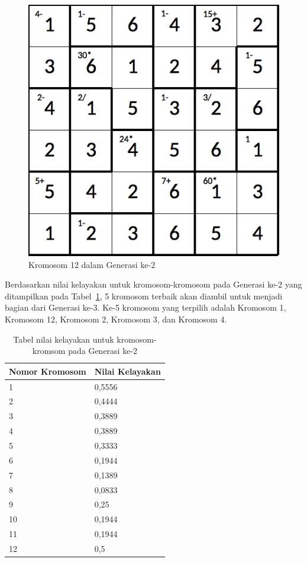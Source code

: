 \begin{figure}
\centering
\captionsetup{justification=centering}
\includegraphics[scale=0.333]{Gambar/hybridgenetic/Generation2Chromosome12}
\caption[Kromosom 12 dalam Generasi ke-2]{Kromosom 12 dalam Generasi ke-2}
\label{fig:analisisg2k12}
\end{figure}

\clearpage

Berdasarkan nilai kelayakan untuk kromosom-kromosom pada Generasi ke-2 yang ditampilkan pada Tabel~\ref{tab:analisishg3}, 5 kromosom terbaik akan diambil untuk menjadi bagian dari Generasi ke-3. Ke-5 kromosom yang terpilih adalah Kromosom 1, Kromosom 12, Kromosom 2, Kromosom 3, dan Kromosom 4.

\begin{table}
\centering
\captionsetup{justification=centering}
\caption[Tabel nilai kelayakan untuk kromosom-kromsom pada Generasi ke-1]{Tabel nilai kelayakan untuk kromosom-kromsom pada Generasi ke-2}
\begin{tabular}{| l | l |}
\hline
Nomor Kromosom & Nilai Kelayakan \\
\hline \hline
1 & 0,5556 \\
\hline
2 & 0,4444 \\
\hline
3 & 0,3889 \\
\hline
4 & 0,3889 \\
\hline
5 & 0,3333 \\
\hline
6 & 0,1944 \\
\hline
7 & 0,1389 \\
\hline
8 & 0,0833 \\
\hline
9 & 0,25 \\
\hline
10 & 0,1944 \\
\hline
11 & 0,1944 \\
\hline
12 & 0,5 \\
\hline
\end{tabular}
\label{tab:analisishg3}
\end{table}

